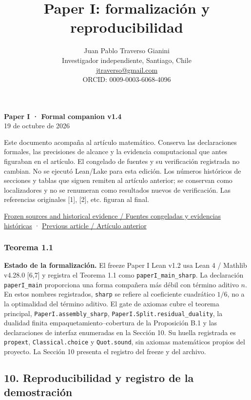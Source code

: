 \documentclass[spanish,11pt,a4paper]{article}
\title{Paper I: formalización y reproducibilidad}
\author{Juan Pablo Traverso Gianini\\\small Investigador independiente, Santiago, Chile\\\small \href{mailto:jtraverso@gmail.com}{jtraverso@gmail.com}\\\small ORCID: 0009-0003-6068-4096}
\date{}
\begin{document}
\raggedbottom
\maketitle
\textbf{Paper I · Formal companion v1.4}\\
19 de octubre de 2026

Este documento acompaña al artículo matemático. Conserva las
declaraciones formales, las precisiones de alcance y la evidencia
computacional que antes figuraban en el artículo. El congelado de
fuentes y su verificación registrada no cambian. No se ejecutó Lean/Lake
para esta edición. Los números históricos de secciones y tablas que
siguen remiten al artículo anterior; se conservan como localizadores y
no se renumeran como resultados nuevos de verificación. Las referencias
originales {[}1{]}, {[}2{]}, etc. figuran al final.

\href{https://github.com/jtraverso/erdos-81-chordal-clique-partitions/tree/eb335845bfa23375d5040ea31fc4f4b366346287/preprints/PAPER_I/05_formalization}{Frozen
sources and historical evidence / Fuentes congeladas y evidencias
históricas} ·
\href{https://github.com/jtraverso/erdos-81-chordal-clique-partitions/tree/eb335845bfa23375d5040ea31fc4f4b366346287/preprints/PAPER_I/01_manuscript}{Previous
article / Artículo anterior}

\subsubsection{Teorema 1.1}\label{teorema-1.1}

\textbf{Estado de la formalización.} El freeze Paper I Lean v1.2 usa
Lean 4 / Mathlib v4.28.0 {[}6,7{]} y registra el Teorema 1.1 como
\nolinkurl{paperI_main_sharp}. La declaración \nolinkurl{paperI_main}
proporciona una forma compañera más débil con término aditivo \(n\). En
estos nombres registrados, \nolinkurl{sharp} se refiere al coeficiente
cuadrático \(1/6\), no a la optimalidad del término aditivo. El gate de
axiomas cubre el teorema principal, \nolinkurl{PaperI.assembly_sharp},
\nolinkurl{PaperI.Split.residual_duality}, la dualidad finita
empaquetamiento--cobertura de la Proposición B.1 y las declaraciones de
interfaz enumeradas en la Sección 10. Su huella registrada es
\nolinkurl{propext}, \nolinkurl{Classical.choice} y \nolinkurl{Quot.sound}, sin
axiomas matemáticos propios del proyecto. La Sección 10 presenta el
registro del freeze y del archivo.

\subsection{10. Reproducibilidad y registro de la
demostración}\label{reproducibilidad-y-registro-de-la-demostraciuxf3n}
\end{document}
